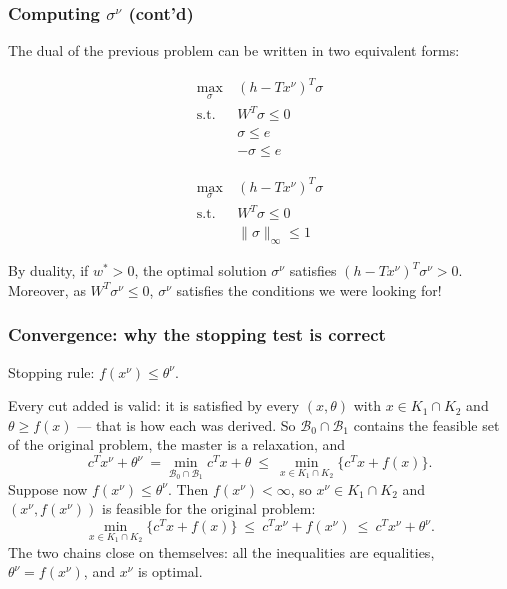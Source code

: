 \documentclass[aspectratio=169]{beamer}
\begin{document}
\begin{frame}
\frametitle{Computing $\sigma^{\nu}$ (cont'd)}

The dual of the previous problem can be written in two equivalent forms:

\begin{minipage}[t]{0.49\textwidth}
\begin{align*}
\max_{\sigma}\ & (h - Tx^{\nu})^T\sigma \\
\text{s.t. } & W^T \sigma \leq 0 \\
& \sigma \leq e \\
& -\sigma \leq e
\end{align*}
\end{minipage}
\begin{minipage}[t]{0.49\textwidth}
\begin{align*}
\max_{\sigma}\ & (h - Tx^{\nu})^T\sigma \\
\text{s.t. } & W^T \sigma \leq 0 \\
& \| \sigma \|_{\infty} \leq 1
\end{align*}
\end{minipage}

\mbox{}

By duality, if $w^* > 0$, the optimal solution $\sigma^{\nu}$ satisfies $(h - Tx^{\nu})^T\sigma^{\nu} > 0$.
Moreover, as $W^T \sigma^{\nu} \leq 0$, $\sigma^{\nu}$ satisfies the conditions we were looking for!
\end{frame}

\begin{frame}
\frametitle{Convergence: why the stopping test is correct}
\small

{\blue Stopping rule}: $f(x^{\nu}) \leq \theta^{\nu}$.

Every cut added is {\red valid}: it is satisfied by every $(x,\theta)$ with $x \in K_1 \cap K_2$ and $\theta \geq f(x)$ --- that is how each was derived. So $\mathcal{B}_0 \cap \mathcal{B}_1$ {\red contains} the feasible set of the original problem, the master is a relaxation, and
\[
c^Tx^{\nu} + \theta^{\nu} \ = \min_{\mathcal{B}_0 \cap \mathcal{B}_1} c^Tx + \theta
\ \leq\ \min_{x \in K_1 \cap K_2} \lbrace c^Tx + f(x) \rbrace .
\]
Suppose now $f(x^{\nu}) \leq \theta^{\nu}$. Then $f(x^{\nu}) < \infty$, so $x^{\nu} \in K_1 \cap K_2$ and $(x^{\nu}, f(x^{\nu}))$ is feasible for the original problem:
\[
\min_{x \in K_1 \cap K_2} \lbrace c^Tx+f(x) \rbrace \ \leq\ c^Tx^{\nu} + f(x^{\nu}) \ \leq\ c^Tx^{\nu} + \theta^{\nu}.
\]
The two chains close on themselves: all the inequalities are equalities, $\theta^{\nu} = f(x^{\nu})$, and $x^{\nu}$ is {\red optimal}.

\end{frame}
\end{document}
